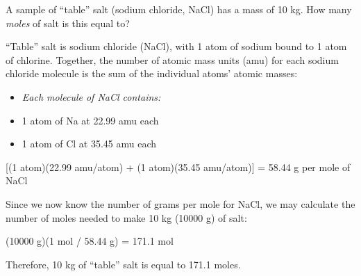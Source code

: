 

A sample of ``table'' salt (sodium chloride, NaCl) has a mass of 10 kg.  How many {\it moles} of salt is this equal to?







``Table'' salt is sodium chloride (NaCl), with 1 atom of sodium bound to 1 atom of chlorine.  Together, the number of atomic mass units (amu) for each sodium chloride molecule is the sum of the individual atoms' atomic masses:

\vskip 10pt

\begin{itemize}
\item{} {\it Each molecule of NaCl contains:}
\item{} 1 atom of Na at 22.99 amu each
\item{} 1 atom of Cl at 35.45 amu each
\end{itemize} 

[(1 atom)(22.99 amu/atom) + (1 atom)(35.45 amu/atom)] = 58.44 g per mole of NaCl

\vskip 10pt

Since we now know the number of grams per mole for NaCl, we may calculate the number of moles needed to make 10 kg (10000 g) of salt:

\vskip 10pt

(10000 g)(1 mol / 58.44 g) = 171.1 mol

\vskip 10pt

Therefore, 10 kg of ``table'' salt is equal to 171.1 moles.












